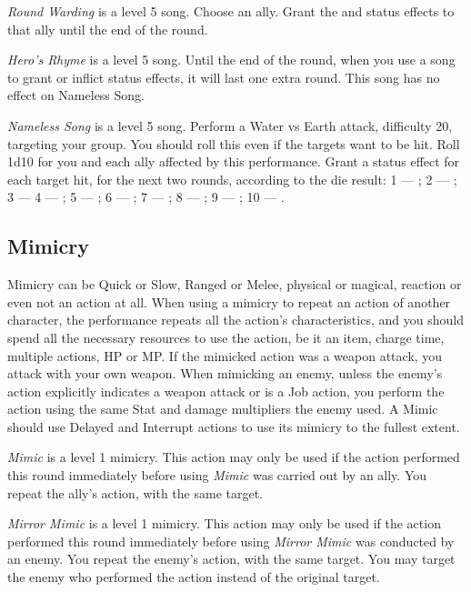 \begin{multicols}{2}
    \textit{Round Warding} is a level 5 song. Choose an ally. Grant the  and  status effects to that ally until the end of the round.
    
	\textit{Hero's Rhyme} is a level 5 song. Until the end of the round, when you use a song to grant or inflict status effects, it will last one extra round. This song has no effect on Nameless Song.
    
    \textit{Nameless Song} is a level 5 song. Perform a Water vs Earth attack, difficulty 20, targeting your group. You should roll this even if the targets want to be hit. Roll 1d10 for you and each ally affected by this performance. Grant a status effect for each target hit, for the next two rounds, according to the die result: 1 --- ; 2 --- ; 3 ---  4 --- ; 5 --- ; 6 --- ; 7 --- ; 8 --- ; 9 --- ; 10 --- .
 
    \subsection{Mimicry}\label{subsec:perf-mimicry}

	Mimicry can be Quick or Slow, Ranged or Melee, physical or magical, reaction or even not an action at all. When using a mimicry to repeat an action of another character, the performance repeats all the action’s characteristics, and you should spend all the necessary resources to use the action, be it an item, charge time, multiple actions, HP or MP\@. If the mimicked action was a weapon attack, you attack with your own weapon. When mimicking an enemy, unless the enemy's action explicitly indicates a weapon attack or is a Job action, you perform the action using the same Stat and damage multipliers the enemy used. A Mimic should use Delayed and Interrupt actions to use its mimicry to the fullest extent.
    
    \textit{Mimic}  is a level 1 mimicry. This action may only be used if the action performed this round immediately before using \textit{Mimic} was carried out by an ally. You repeat the ally’s action, with the same target.
    
    \textit{Mirror Mimic} is a level 1 mimicry. This action may only be used if the action performed this round immediately before using \textit{Mirror Mimic} was conducted by an enemy. You repeat the enemy’s action, with the same target. You may target the enemy who performed the action instead of the original target. 
    

\end{multicols}
